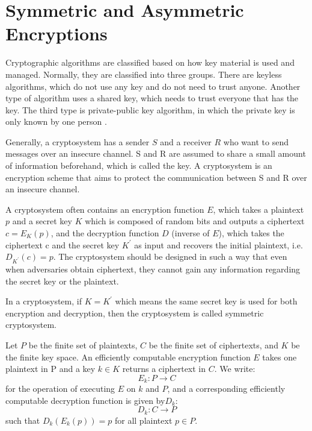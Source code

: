 \section{Symmetric and Asymmetric Encryptions}
Cryptographic algorithms are classified based on how key material is used and managed. Normally, they are classified into three groups. There are keyless algorithms, which do not use any key and do not need to trust anyone. Another type of algorithm uses a shared key, which needs to trust everyone that has the key.  The third type is private-public key algorithm, in which the private key is only known by one person \cite{PrCryEngCourtois}.

Generally, a cryptosystem has a sender $S$ and a receiver $R$ who want to send messages over an insecure channel. S and R are assumed to share a small amount of information beforehand, which is called the key. A cryptosystem is an encryption scheme that aims to protect the communication between S and R over an insecure channel.

A cryptosystem often contains an encryption function $E$, which takes a plaintext $p$ and a secret key $K$ which is composed of random bits and outputs a ciphertext $c = E_{K}(p)$, and the decryption function $D$ (inverse of $E$), which takes the ciphertext c and the secret key $K^{'}$ as input and recovers the initial plaintext, i.e. $D_{K^{'}}(c)=p$. The cryptosystem should be designed in such a way that even when adversaries obtain ciphertext, they cannot gain any information regarding the secret key or the plaintext.

In a cryptosystem, if $K = K^{'}$ which means the same secret key is used for both encryption and decryption, then the cryptosystem is called symmetric cryptosystem.

\begin{mydef}
	Let $P$ be the finite set of plaintexts, $C$ be the finite set of ciphertexts, and $K$ be the finite key space. An efficiently computable encryption function $E$ takes one plaintext in P and a key $k \in K$ returns a ciphertext in $C$. We write:  
	$$E_{k}:P \rightarrow C$$ 
	for the operation of executing $E$ on $k$ and $P$, and a corresponding efficiently computable decryption function is given by$D_{k}$: 
	$$ D_{k} : C \rightarrow P$$ 
	such that $D_{k}(E_{k}(p)) = p$ for all plaintext $p \in P$.
\end{mydef}

